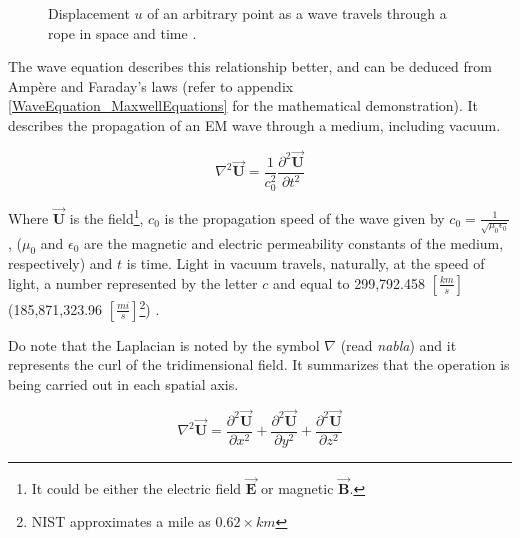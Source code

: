 \begin{figure}[htbp]
    \centering
    \caption{Displacement $u$ of an arbitrary point as a wave travels through a rope in space and time \cite{u_parameter_explanation-figure}.}
    \label{fig:u_parameter_explanation}
\end{figure}

The wave equation describes this relationship better, and can be deduced from Ampère and Faraday's laws (refer to appendix \ref{WaveEquation_MaxwellEquations} for the mathematical demonstration). It describes the propagation of an EM wave through a medium, including vacuum.

\begin{equation}
    \nabla^2 \overrightarrow{\textbf{U}} = \frac{1}{c_0^2}\frac{\partial^2 \overrightarrow{\textbf{U}}}{\partial t^2}
    \label{Wave_Equation}
\end{equation}

Where $\overrightarrow{\textbf{U}}$ is the field\footnote{It could be either the electric field $\overrightarrow{\textbf{E}}$ or magnetic $\overrightarrow{\textbf{B}}$.}, $c_0$ is the propagation speed of the wave given by $c_0 = \frac{1}{\sqrt{\mu_0 \epsilon_0}}$, ($\mu_0$ and $\epsilon_0$ are the magnetic and electric permeability constants of the medium, respectively) and $t$ is time. Light in vacuum travels, naturally, at the speed of light, a number represented by the letter $c$ and equal to 299,792.458 $[\frac{km}{s}]$ (185,871,323.96 $[\frac{mi}{s}]$\footnote{NIST approximates a mile as $0.62 \times km$}) \cite{Hecht_Optics-Chapter3_EM_Waves} \cite{Speed_of_Light:NIST}.

Do note that the Laplacian is noted by the symbol $\nabla$ (read \textit{nabla}) and it represents the curl of the tridimensional field. It summarizes that the operation is being carried out in each spatial axis.

\begin{equation}
    \nabla^2 \overrightarrow{\textbf{U}} = \frac{\partial^2 \overrightarrow{\textbf{U}}}{\partial x^2} + \frac{\partial^2 \overrightarrow{\textbf{U}}}{\partial y^2} + \frac{\partial^2 \overrightarrow{\textbf{U}}}{\partial z^2}
    \label{Laplacian}
\end{equation}

